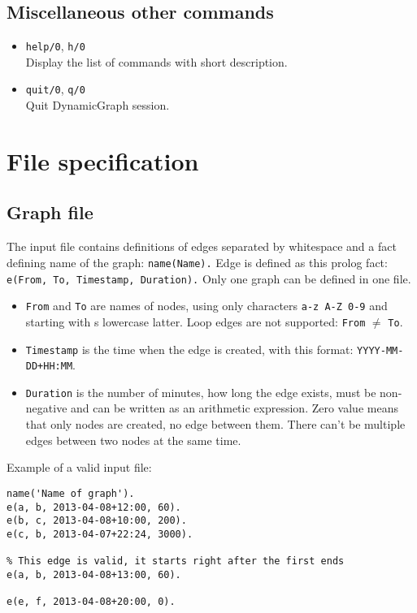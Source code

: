 \documentclass[11pt, a4paper,draft]{article}
\newcommand{\pl}[1]{\texttt{#1}} %
\theoremstyle{plain}
\theoremstyle{definition}
\theoremstyle{remark}
\begin{document}
\subsection{Miscellaneous other commands}

\begin{itemize}
\item \pl{help/0}, \pl{h/0} \\
Display the list of commands with short description.

\item \pl{quit/0}, \pl{q/0} \\
Quit DynamicGraph session.
\end{itemize}

\section{File specification}
\label{sec:files}

\subsection{Graph file}
\label{sec:files-graph}

The input file contains definitions of edges separated by whitespace 
and a fact defining name of the graph: \pl{name(Name).}
Edge is defined as this prolog fact: \pl{e(From, To, Timestamp, Duration).}
Only one graph can be defined in one file.

\begin{itemize}
	\item \pl{From} and \pl{To} are names of nodes, using only characters \texttt{a-z A-Z 0-9}
		and starting with s lowercase latter.	
		Loop edges are not supported: \pl{From} $\ne$ \pl{To}.
	\item \pl{Timestamp} is the time when the edge is created,
		with this format: \pl{YYYY-MM-DD+HH:MM}.
	\item \pl{Duration} is the number of minutes, how long the edge exists, must be non-negative
		and can be written as an arithmetic expression.
		Zero value means that only nodes are created, no edge between them. 
		There can't be multiple edges between two nodes at the same time.
\end{itemize}
Example of a valid input file:

\begin{verbatim}
name('Name of graph').
e(a, b, 2013-04-08+12:00, 60).
e(b, c, 2013-04-08+10:00, 200).
e(c, b, 2013-04-07+22:24, 3000).

% This edge is valid, it starts right after the first ends
e(a, b, 2013-04-08+13:00, 60).

e(e, f, 2013-04-08+20:00, 0).

\end{verbatim}
\end{document}
